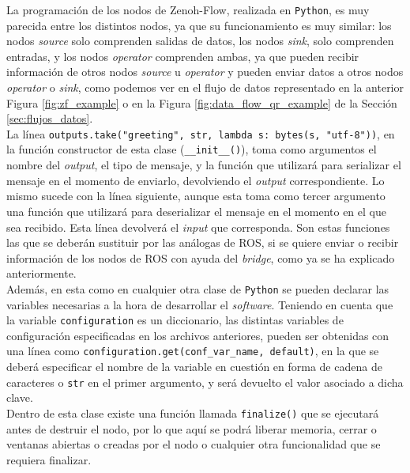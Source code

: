 La programación de los nodos de Zenoh-Flow, realizada en \texttt{Python}, es muy
parecida entre los distintos nodos, ya que su funcionamiento es muy similar: los
nodos \textit{source} solo comprenden salidas de datos, los nodos \textit{sink},
solo comprenden entradas, y los nodos \textit{operator} comprenden ambas, ya que
pueden recibir información de otros nodos \textit{source} u \textit{operator} y
pueden enviar datos a otros nodos \textit{operator} o \textit{sink}, como
podemos ver en el flujo de datos representado en la anterior Figura
\ref{fig:zf_example} o en la Figura \ref{fig:data_flow_qr_example} de la Sección
\ref{sec:flujos_datos}.
\\

La línea \verb|outputs.take("greeting", str, lambda s: bytes(s, "utf-8"))|, en
la función constructor de esta clase (\verb|__init__()|), toma como argumentos
el nombre del \textit{output}, el tipo de mensaje, y la función que utilizará
para serializar el mensaje en el momento de enviarlo, devolviendo el
\textit{output} correspondiente.
Lo mismo sucede con la línea siguiente, aunque esta toma como tercer argumento
una función que utilizará para deserializar el mensaje en el momento en el que
sea recibido.
Esta línea devolverá el \textit{input} que corresponda.
Son estas funciones las que se deberán sustituir por las análogas de ROS, si se
quiere enviar o recibir información de los nodos de ROS con ayuda del
\textit{bridge}, como ya se ha explicado anteriormente.
\\

Además, en esta como en cualquier otra clase de \texttt{Python} se pueden
declarar las variables necesarias a la hora de desarrollar el \textit{software}.
Teniendo en cuenta que la variable \verb|configuration| es un diccionario, las
distintas variables de configuración especificadas en los archivos anteriores,
pueden ser obtenidas con una línea como
\verb|configuration.get(conf_var_name, default)|, en la que se deberá
especificar el nombre de la variable en cuestión en forma de cadena de
caracteres o \texttt{str} en el primer argumento, y será devuelto el valor
asociado a dicha clave.
\\

Dentro de esta clase existe una función llamada \verb|finalize()| que se
ejecutará antes de destruir el nodo, por lo que aquí se podrá liberar memoria,
cerrar o ventanas abiertas o creadas por el nodo o cualquier otra funcionalidad
que se requiera finalizar.
\\


